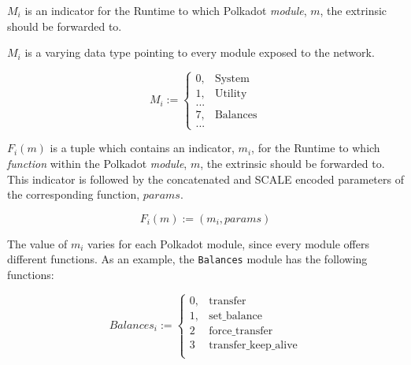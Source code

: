 \begin{definition}
    \label{defn-module-indicator}
    $M_i$ is an indicator for the Runtime to which Polkadot \textit{module},
    $m$, the extrinsic should be forwarded to.
    \newline

    $M_i$ is a varying data type pointing to every module exposed to the
    network.

    \[
    M_i :=
    \begin{cases}
    0, & \text{System} \\
    1, & \text{Utility} \\
    ... & \\
    7, & \text{Balances} \\
    ... &
    \end{cases}
    \]
\end{definition}

\begin{definition}
    \label{defn-function-indicator}
    $F_i(m)$ is a tuple which contains an indicator, $m_i$, for the Runtime to
    which \textit{function} within the Polkadot \textit{module}, $m$, the
    extrinsic should be forwarded to. This indicator is followed by the
    concatenated and SCALE encoded parameters of the corresponding function,
    $params$.

    \[
        F_i(m) := (m_i, params)
    \]

    The value of $m_i$ varies for each Polkadot module, since every module
    offers different functions. As an example, the \verb|Balances| module has
    the following functions:

    \[
        Balances_i :=
        \begin{cases}
        0, & \text{transfer} \\
        1, & \text{set\_balance} \\
        2 & \text{force\_transfer} \\
        3 & \text{transfer\_keep\_alive} \\
        \end{cases}
    \]
\end{definition}
